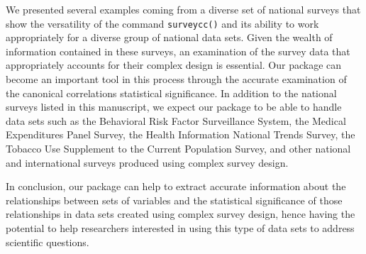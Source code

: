 We presented several examples coming from a diverse set of national surveys that show the versatility of the command \texttt{surveycc()} and its ability to work appropriately for a diverse group of national data sets. Given the wealth of information contained in these surveys, an examination of the survey data that appropriately accounts for their complex design is essential. Our package can become an important tool in this process through the accurate examination of the canonical correlations statistical significance. In addition to the national surveys listed in this manuscript, we expect our package to be able to handle data sets such as the Behavioral Risk Factor Surveillance System, the Medical Expenditures Panel Survey, the Health Information National Trends Survey, the Tobacco Use Supplement to the Current Population Survey, and other national and international surveys produced using complex survey design.

In conclusion, our package  can help to extract accurate information about the relationships between sets of variables and the statistical significance of those relationships in data sets created using complex survey design, hence having the potential to help researchers interested in using this type of data sets to address scientific questions.



\address{%
Raul Cruz-Cano\\
Department of Epidemiology and Biostatistics, IU School of Public Health\\%
Indiana University School of Public Health\\ Bloomington, IN\\ USA\\
%
%
%
\href{mailto:raulcruz@iu.edu}{\nolinkurl{raulcruz@iu.edu}}%
}

\address{%
Aaron Cohen\\
Department of Epidemiology and Biostatistics, IU School of Public Health\\%
Biostatistics Consulting Center\\ Department of Epidemiology and Biostatistics\\ Indiana University School of Public Health\\ Bloomington, IN\\ USA\\
%
%
%
\href{mailto:cohenaa@iu.edu}{\nolinkurl{cohenaa@iu.edu}}%
}

\address{%
Erin Mead-Morse\\
Department of Public Health Sciences, UConn Health, School of Medicine\\%
UConn Health, School of Medicine\\ Farmington, CT\\ USA\\
%
%
%
\href{mailto:mead@uchc.edu}{\nolinkurl{mead@uchc.edu}}%
}
